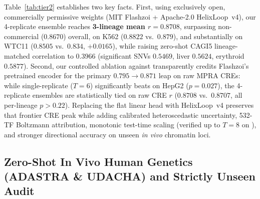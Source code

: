 \documentclass[10.5pt,a4paper]{article}
\begin{document}
Table~\ref{tab:tier2} establishes two key facts. First, using exclusively open, commercially permissive weights (MIT Flashzoi + Apache-2.0 HelixLoop~v4), our 4-replicate ensemble reaches \textbf{3-lineage mean $r=0.8708$}, surpassing non-commercial  ($0.8670$) overall, on K562 ($0.8822$ vs.\ $0.879$), and substantially on WTC11 ($0.8505$ vs.\ $0.834$, $+0.0165$), while raising zero-shot CAGI5 lineage-matched correlation to $0.3966$ (significant SNVs $0.5469$, liver $0.5624$, erythroid $0.5877$). Second, our controlled ablation against  transparently credits Flashzoi's pretrained encoder for the primary $0.795\to 0.871$ leap on raw MPRA CREs: while single-replicate  ($T=6$) significantly beats  on HepG2 ($p=0.027$), the 4-replicate ensembles are statistically tied on raw CRE $r$ ($0.8708$ vs.\ $0.8707$, all per-lineage $p>0.22$). Replacing the flat linear head with HelixLoop~v4 preserves that frontier CRE peak while adding calibrated heteroscedastic uncertainty, 532-TF Boltzmann attribution, monotonic test-time scaling (verified up to $T=8$ on ), and stronger directional accuracy on unseen \emph{in vivo} chromatin loci.

\subsection{Zero-Shot In Vivo Human Genetics (ADASTRA \& UDACHA) and Strictly Unseen  Audit}
\end{document}
